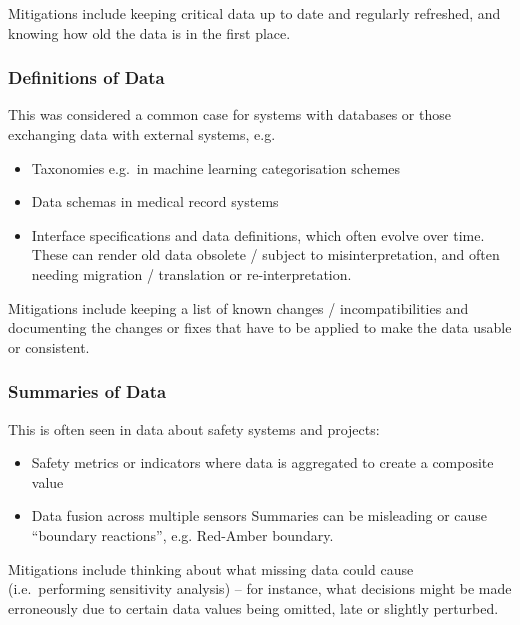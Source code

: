 Mitigations include keeping \gls{critical data} up to date and regularly refreshed, and knowing how old the data is in the first place.

\subsubsection{Definitions of Data}\label{bkm:dark8}
This was considered a common case for systems with \glspl{database} or those exchanging data with external systems, e.g.
\begin{itemize}
\item Taxonomies e.g.\ in machine learning categorisation schemes
  \item Data schemas in medical record systems 
  \item Interface specifications and data definitions, which often evolve over time. These can render old data obsolete / subject to misinterpretation, and often needing migration / translation or re-interpretation.
\end{itemize}

Mitigations include keeping a list of known changes / incompatibilities and documenting the changes or fixes that have to be applied to make the data usable or consistent.

\subsubsection{Summaries of Data}\label{bkm:dark9}
This is often seen in data about safety systems and projects:
\begin{itemize}
\item Safety metrics or indicators where data is aggregated to create a composite value
  \item Data fusion across multiple sensors
Summaries can be misleading or cause “boundary reactions”, e.g. Red-Amber boundary.
\end{itemize}

Mitigations include thinking about what missing data could cause (i.e.\ performing sensitivity analysis) -- for instance, what decisions might be made erroneously due to certain data values being omitted, late or slightly perturbed.

